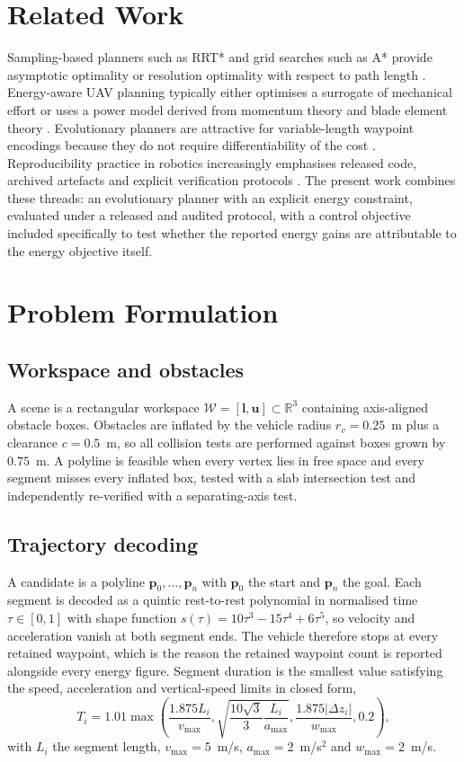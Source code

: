 \documentclass[conference]{IEEEtran}
\begin{document}
\section{Related Work}
Sampling-based planners such as RRT* and grid searches such as A* provide
asymptotic optimality or resolution optimality with respect to path length
\cite{lavalle,karaman}. Energy-aware UAV planning typically either optimises a
surrogate of mechanical effort or uses a power model derived from momentum
theory and blade element theory \cite{leishman,dilorenzo}. Evolutionary planners
are attractive for variable-length waypoint encodings because they do not
require differentiability of the cost \cite{roberge}. Reproducibility practice in
robotics increasingly emphasises released code, archived artefacts and explicit
verification protocols \cite{bonsignorio}. The present work combines these
threads: an evolutionary planner with an explicit energy constraint, evaluated
under a released and audited protocol, with a control objective included
specifically to test whether the reported energy gains are attributable to the
energy objective itself.

\section{Problem Formulation}
\subsection{Workspace and obstacles}
A scene is a rectangular workspace $\mathcal{W} = [\mathbf{l}, \mathbf{u}]
\subset \mathbb{R}^3$ containing axis-aligned obstacle boxes. Obstacles are
inflated by the vehicle radius $r_v = 0.25$~m plus a clearance $c = 0.5$~m, so
all collision tests are performed against boxes grown by $0.75$~m. A polyline is
feasible when every vertex lies in free space and every segment misses every
inflated box, tested with a slab intersection test and independently re-verified
with a separating-axis test.

\subsection{Trajectory decoding}
A candidate is a polyline $\mathbf{p}_0, \dots, \mathbf{p}_n$ with
$\mathbf{p}_0$ the start and $\mathbf{p}_n$ the goal. Each segment is decoded as
a quintic rest-to-rest polynomial in normalised time $\tau \in [0,1]$ with
shape function $s(\tau) = 10\tau^3 - 15\tau^4 + 6\tau^5$, so velocity and
acceleration vanish at both segment ends. The vehicle therefore stops at every
retained waypoint, which is the reason the retained waypoint count is reported
alongside every energy figure. Segment duration is the smallest value satisfying
the speed, acceleration and vertical-speed limits in closed form,
\begin{equation}
T_i = 1.01 \max\!\left(\frac{1.875 L_i}{v_{\max}},
\sqrt{\frac{10\sqrt{3}}{3}\frac{L_i}{a_{\max}}},
\frac{1.875 |\Delta z_i|}{w_{\max}}, 0.2\right),
\end{equation}
with $L_i$ the segment length, $v_{\max} = 5$~m/s, $a_{\max} = 2$~m/s$^2$ and
$w_{\max} = 2$~m/s.
\end{document}
